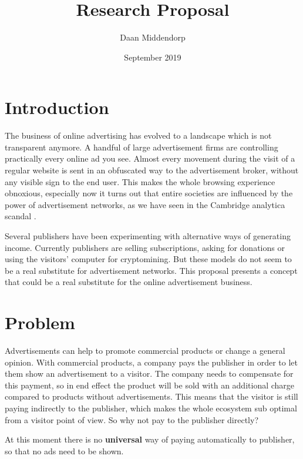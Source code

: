\documentclass[a4paper]{article}
\title{Research Proposal}
\author{Daan Middendorp}
\date{September 2019}
\begin{document}
\maketitle

\section{Introduction}
The business of online advertising has evolved to a landscape which is not transparent anymore. A handful of large advertisement firms are controlling practically every online ad you see. Almost every movement during the visit of a regular website is sent in an obfuscated way to the advertisement broker, without any visible sign to the end user. This makes the whole browsing experience obnoxious, especially now it turns out that entire societies are influenced by the power of advertisement networks, as we have seen in the Cambridge analytica scandal .

Several publishers have been experimenting with alternative ways of generating income. Currently publishers are selling subscriptions, asking for donations or using the visitors' computer for cryptomining. But these models do not seem to be a real substitute for advertisement networks. This proposal presents a concept that could be a real substitute for the online advertisement business.

\section{Problem}
Advertisements can help to promote commercial products or change a general opinion. With commercial products, a company pays the publisher in order to let them show an advertisement to a visitor. The company needs to compensate for this payment, so in end effect the product will be sold with an additional charge compared to products without advertisements. This means that the visitor is still paying indirectly to the publisher, which makes the whole ecosystem sub optimal from a visitor point of view. So why not pay to the publisher directly?

At this moment there is no \textbf{universal} way of paying automatically to publisher, so that no ads need to be shown.
\end{document}
